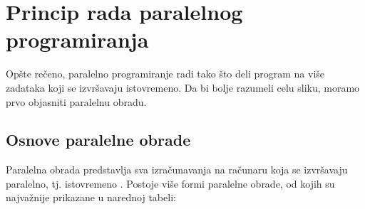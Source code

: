 \documentclass[a4paper]{article}
\begin{document}
	\section{Princip rada paralelnog programiranja}
	Opšte rečeno, paralelno programiranje radi tako što deli program na više zadataka koji se izvršavaju istovremeno. Da bi bolje razumeli celu sliku, moramo prvo objasniti paralelnu obradu.
	\subsection{Osnove paralelne obrade}
	Paralelna obrada predstavlja sva izračunavanja na računaru koja se izvršavaju paralelno, tj. istovremeno \cite{p98}. Postoje više formi paralelne obrade, od kojih su najvažnije prikazane u narednoj tabeli:\\
\end{document}

